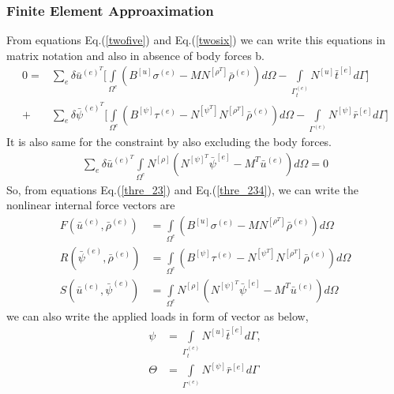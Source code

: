 \documentclass[12pt]{article}
\begin{document}
\subsubsection{ Finite Element Approaximation  }
From equations Eq.(\ref{twofive}) and Eq.(\ref{twosix}) we can write this equations in matrix notation and also in absence of body forces b.
\begin{equation}\label{thre_23}
\begin{aligned}
0 = &\sum_{e} \delta \bar{u}^{{(e)}^T} \Bigg[\int\limits_{\Omega^{e}}\! (B^{[u]}\sigma^{(e)} - MN^{[\rho^{T}]} \bar{\rho}^{(e)} ) d\Omega - \int\limits_{\Gamma^{(e)}_t}\!  N^{[u]}\bar{t}^{[e]}d\Gamma \Bigg] \\ + &\sum_{e} \delta \bar{\psi}^{{(e)}^T} \Bigg[\int\limits_{\Omega^{e}}\! (B^{[\psi]}\tau^{(e)} - N^{[\psi^{T}]}N^{[\rho^{T}]} \bar{\rho}^{(e)} ) d\Omega - \int\limits_{\Gamma^{(e)}}\!  N^{[\psi]}\bar{r}^{[e]}d\Gamma \Bigg]
\end{aligned}
\end{equation}
It is also same for the constraint by also excluding the body forces.
\begin{equation}\label{thre_234}
\begin{aligned}
\sum_{e} \delta \bar{u}^{{(e)}^T} \int\limits_{\Omega^{e}}\! N^{[\rho]}(N^{[\psi]^{T}}\bar{\psi}^{[e]} - M^T\bar{u}^{(e)} ) d\Omega = 0
\end{aligned}
\end{equation}
So, from equations Eq.(\ref{thre_23}) and Eq.(\ref{thre_234}), we can write the nonlinear internal force vectors are 
\begin{equation}\label{thre_2345}
\begin{aligned}
F(\bar{u}^{(e)},\bar{\rho}^{(e)}) &= \int\limits_{\Omega^{e}}\! (B^{[u]}\sigma^{(e)} - MN^{[\rho^{T}]} \bar{\rho}^{(e)} ) d\Omega \\
R(\bar{\psi}^{(e)},\bar{\rho}^{(e)}) &= \int\limits_{\Omega^{e}}\! (B^{[\psi]}\tau^{(e)} - N^{[\psi^{T}]}N^{[\rho^{T}]} \bar{\rho}^{(e)} ) d\Omega \\
S(\bar{u}^{(e)},\bar{\psi}^{(e)}) &= \int\limits_{\Omega^{e}}\! N^{[\rho]}(N^{[\psi]^{T}}\bar{\psi}^{[e]} - M^T\bar{u}^{(e)} ) d\Omega
\end{aligned}
\end{equation}
we can also write the applied loads in form of vector as below,
\begin{equation}\label{thre_23456}
\begin{aligned}
\psi &= \int\limits_{\Gamma^{(e)}_t}\!  N^{[u]}\bar{t}^{[e]}d\Gamma, \\
\Theta &= \int\limits_{\Gamma^{(e)}}\!  N^{[\psi]}\bar{r}^{[e]}d\Gamma
\end{aligned}
\end{equation}
\end{document}
